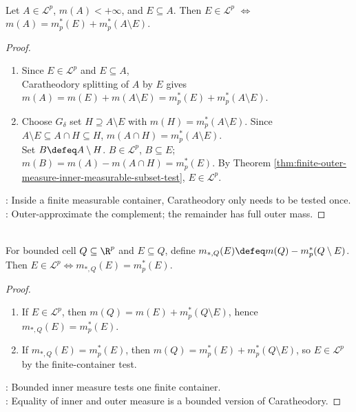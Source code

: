 \begin{theorem} \label{thm:single-container-caratheodory-test} \\
Let $A\in\mathcal{L}^p$, $m(A)<+\infty$, and $E\subseteq A$. Then $E\in\mathcal{L}^p$ $\Longleftrightarrow$ $m(A)=m_p^\ast(E)+m_p^\ast(A\setminus E)$.
\begin{proof}
\begin{enumerate}[label=\roman*.]
\setlength{\itemsep}{0pt}
\item[$(\Rightarrow)$] Since $E\in\mathcal{L}^p$ and $E\subseteq A$,\\
Caratheodory splitting of $A$ by $E$ gives $m(A)=m(E)+m(A\setminus E)=m_p^\ast(E)+m_p^\ast(A\setminus E)$.
\item[$(\Leftarrow)$] Choose $G_\delta$ set $H\supseteq A\setminus E$ with $m(H)=m_p^\ast(A\setminus E)$. Since $A\setminus E\subseteq A\cap H\subseteq H$, $m(A\cap H)=m_p^\ast(A\setminus E)$.\\
Set $B\defeq A\setminus H$. $B\in\mathcal{L}^p$, $B\subseteq E$; $m(B)=m(A)-m(A\cap H)=m_p^\ast(E)$. By Theorem \ref{thm:finite-outer-measure-inner-measurable-subset-test}, $E\in\mathcal{L}^p$.
\end{enumerate}
: Inside a finite measurable container, Caratheodory only needs to be tested once.\\
: Outer-approximate the complement; the remainder has full outer mass.
\end{proof}
\end{theorem}

\begin{corollary} \label{cor:bounded-inner-measure-test} \\
For bounded cell $Q\subseteq\R^p$ and $E\subseteq Q$, define $m_{*,Q}(E)\defeq m(Q)-m_p^\ast(Q\setminus E)$. Then $E\in\mathcal{L}^p\Longleftrightarrow m_{*,Q}(E)=m_p^\ast(E)$.
\begin{proof}
\begin{enumerate}[label=\roman*.]
\setlength{\itemsep}{0pt}
\item[$(\Rightarrow)$] If $E\in\mathcal{L}^p$, then $m(Q)=m(E)+m_p^\ast(Q\setminus E)$, hence $m_{*,Q}(E)=m_p^\ast(E)$.
\item[$(\Leftarrow)$] If $m_{*,Q}(E)=m_p^\ast(E)$, then $m(Q)=m_p^\ast(E)+m_p^\ast(Q\setminus E)$, so $E\in\mathcal{L}^p$ by the finite-container test.
\end{enumerate}
: Bounded inner measure tests one finite container.\\
: Equality of inner and outer measure is a bounded version of Caratheodory.
\end{proof}
\end{corollary}
